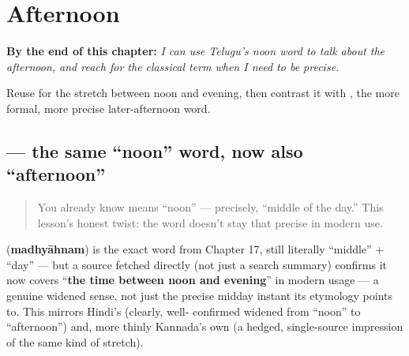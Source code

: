 
\chapter{Afternoon}
\label{ch:te-afternoon}

\begin{chapteropening}
\textbf{By the end of this chapter:} \emph{I can use Telugu's noon word to talk about the afternoon, and reach for the classical term when I need to be precise.}

Reuse  for the stretch between noon and evening, then contrast it with , the more formal, more precise later-afternoon word.
\end{chapteropening}

\section[\texorpdfstring{\te{మధ్యాహ్నం} (madhyāhnam)}{మధ్యాహ్నం (madhyāhnam)}]{ — the same \textquotedblleft{}noon\textquotedblright{} word, now also \textquotedblleft{}afternoon\textquotedblright{}}

\label{lesson:TE-C28-madhyahnam-widened}



\begin{quote}
You already know  means \textquotedblleft{}noon\textquotedblright{} — precisely, \textquotedblleft{}middle of the day.\textquotedblright{} This lesson's honest twist: the word doesn't stay that precise in modern use.
\end{quote}

\begin{culture}
\textbf{} (\textbf{madhyāhnam}) is the exact word from Chapter 17, still literally \textquotedblleft{}middle\textquotedblright{} + \textquotedblleft{}day\textquotedblright{} — but a source fetched directly (not just a search summary) confirms it now covers \textquotedblleft{}\textbf{the time between noon and evening}\textquotedblright{} in modern usage — a genuine widened sense, not just the precise midday instant its etymology points to. This mirrors Hindi's \textbf{} (clearly, well- confirmed widened from \textquotedblleft{}noon\textquotedblright{} to \textquotedblleft{}afternoon\textquotedblright{}) and, more thinly Kannada's own \textbf{} (a hedged, single-source impression of the same kind of stretch).
\end{culture}

